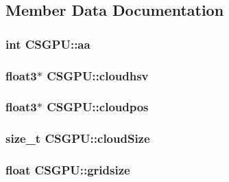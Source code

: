 \subsection{\-Member \-Data \-Documentation}
\hypertarget{class_c_s_g_p_u_a8b544902a5b4fe5f7e010dda96ce7e93}{
\subsubsection[{aa}]{\setlength{\rightskip}{0pt plus 5cm}int {\bf \-C\-S\-G\-P\-U\-::aa}}}\label{class_c_s_g_p_u_a8b544902a5b4fe5f7e010dda96ce7e93}
\hypertarget{class_c_s_g_p_u_a16a0b4b64cd6b658b618ddab15e4106a}{
\subsubsection[{cloudhsv}]{\setlength{\rightskip}{0pt plus 5cm}float3$\ast$ {\bf \-C\-S\-G\-P\-U\-::cloudhsv}}}\label{class_c_s_g_p_u_a16a0b4b64cd6b658b618ddab15e4106a}
\hypertarget{class_c_s_g_p_u_aae0654f6af8886eeef6a455efbc1e1ed}{
\subsubsection[{cloudpos}]{\setlength{\rightskip}{0pt plus 5cm}float3$\ast$ {\bf \-C\-S\-G\-P\-U\-::cloudpos}}}\label{class_c_s_g_p_u_aae0654f6af8886eeef6a455efbc1e1ed}
\hypertarget{class_c_s_g_p_u_a3e3845d161dfaf5087e1a9329f0795cb}{
\subsubsection[{cloud\-Size}]{\setlength{\rightskip}{0pt plus 5cm}size\-\_\-t {\bf \-C\-S\-G\-P\-U\-::cloud\-Size}}}\label{class_c_s_g_p_u_a3e3845d161dfaf5087e1a9329f0795cb}
\hypertarget{class_c_s_g_p_u_a819ee6c0a3e2733e3edc350f9e090d39}{
\subsubsection[{gridsize}]{\setlength{\rightskip}{0pt plus 5cm}float {\bf \-C\-S\-G\-P\-U\-::gridsize}}}\label{class_c_s_g_p_u_a819ee6c0a3e2733e3edc350f9e090d39}
